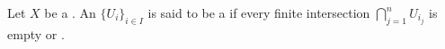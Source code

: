 \begin{definition} \label{definition:good_open_cover_of_a_topological_space}
    Let $X$ be a . 
    An  $\{U_i\}_{i \in I}$ is said to be a  if every finite intersection $\bigcap_{j=1}^n U_{i_j}$ is empty or .
\end{definition}